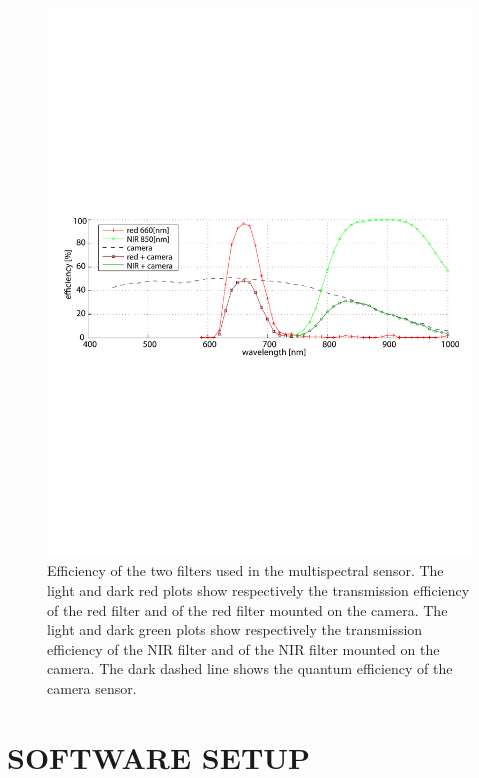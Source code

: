 \documentclass[letterpaper, 10pt, conference]{ieeeconf}      %
\begin{document}
   
   \begin{figure}[t]
      \vspace{1mm}\centering
      \includegraphics[trim = 10mm 99mm 10mm 99mm, clip,width=0.99\linewidth]{../images/plot_reflectance2.pdf}\vspace{-2mm}
      \caption{Efficiency of the two filters used in the multispectral sensor. The light and dark red plots show respectively the transmission efficiency of the red filter and of the red  filter mounted on the camera. The light and dark green plots show respectively the transmission efficiency of the NIR filter and of the NIR  filter mounted on the camera. The dark dashed line shows the quantum efficiency of the camera sensor.}
            \vspace{-4mm}
\label{fig:reflectance}
   \end{figure}


\section{SOFTWARE SETUP}\label{sec:software_setup}
\end{document}
